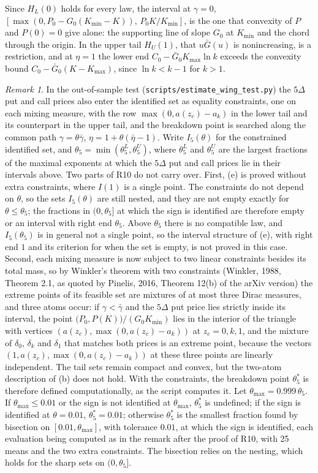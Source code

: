 \documentclass[11pt]{article}
\theoremstyle{remark}
\newtheorem{remark}[proposition]{Remark}
\begin{document}
Since $H_L(0)$ holds for every law, the interval at $\gamma=0$, $[\max(0,P_0-G_0(K_{\min}-K)),\,P_0K/K_{\min}]$, is the one that convexity of $P$ and $P(0)=0$ give alone: the supporting line of slope $G_0$ at $K_{\min}$ and the chord through the origin. In the upper tail $H_U(1)$, that $u\bar G(u)$ is nonincreasing, is a restriction, and at $\eta=1$ the lower end $C_0-\bar G_0K_{\max}\ln k$ exceeds the convexity bound $C_0-\bar G_0(K-K_{\max})$, since $\ln k<k-1$ for $k>1$.

\begin{remark}
In the out-of-sample test (\texttt{scripts/estimate\_wing\_test.py}) the $5\Delta$ put and call prices also enter the identified set as equality constraints, one on each mixing measure, with the row $\max(0,a(z_c)-a_k)$ in the lower tail and its counterpart in the upper tail, and the breakdown point is searched along the common path $\gamma=\theta\bar\gamma$, $\eta=1+\theta(\bar\eta-1)$. Write $I_5(\theta)$ for the constrained identified set, and $\theta_5=\min(\theta_5^L,\theta_5^U)$, where $\theta_5^L$ and $\theta_5^U$ are the largest fractions of the maximal exponents at which the $5\Delta$ put and call prices lie in their intervals above. Two parts of R10 do not carry over. First, (e) is proved without extra constraints, where $I(1)$ is a single point. The constraints do not depend on $\theta$, so the sets $I_5(\theta)$ are still nested, and they are not empty exactly for $\theta\le\theta_5$; the fractions in $(0,\theta_5]$ at which the sign is identified are therefore empty or an interval with right end $\theta_5$. Above $\theta_5$ there is no compatible law, and $I_5(\theta_5)$ is in general not a single point, so the interval structure of (e), with right end $1$ and its criterion for when the set is empty, is not proved in this case. Second, each mixing measure is now subject to two linear constraints besides its total mass, so by Winkler's theorem with two constraints (Winkler, 1988, Theorem 2.1, as quoted by Pinelis, 2016, Theorem 12(b) of the arXiv version) the extreme points of its feasible set are mixtures of at most three Dirac measures, and three atoms occur: if $\gamma<\bar\gamma$ and the $5\Delta$ put price lies strictly inside its interval, the point $\bigl(P_0,P(K)\bigr)/(G_0K_{\min})$ lies in the interior of the triangle with vertices $(a(z_c),\max(0,a(z_c)-a_k))$ at $z_c=0,k,1$, and the mixture of $\delta_0$, $\delta_k$ and $\delta_1$ that matches both prices is an extreme point, because the vectors $(1,a(z_c),\max(0,a(z_c)-a_k))$ at these three points are linearly independent. The tail sets remain compact and convex, but the two-atom description of (b) does not hold. With the constraints, the breakdown point $\theta^*_5$ is therefore defined computationally, as the script computes it. Let $\theta_{\max}=0.999\,\theta_5$. If $\theta_{\max}\le0.01$ or the sign is not identified at $\theta_{\max}$, $\theta^*_5$ is undefined; if the sign is identified at $\theta=0.01$, $\theta^*_5=0.01$; otherwise $\theta^*_5$ is the smallest fraction found by bisection on $[0.01,\theta_{\max}]$, with tolerance $0.01$, at which the sign is identified, each evaluation being computed as in the remark after the proof of R10, with 25 means and the two extra constraints. The bisection relies on the nesting, which holds for the sharp sets on $(0,\theta_5]$.

\end{remark}
\end{document}
